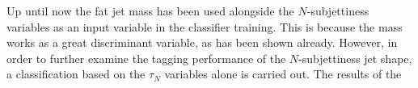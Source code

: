 \documentclass[main]{subfiles} %
\begin{document}
Up until now the fat jet mass has been used alongside the $N$-subjettiness variables as an input variable in the classifier training. This is because the mass works as a great discriminant variable, as has been shown already. However, in order to further examine the tagging performance of the $N$-subjettiness jet shape, a classification based on the $\tau_N$ variables alone is carried out. The results of the 

















\biblio
\end{document}
